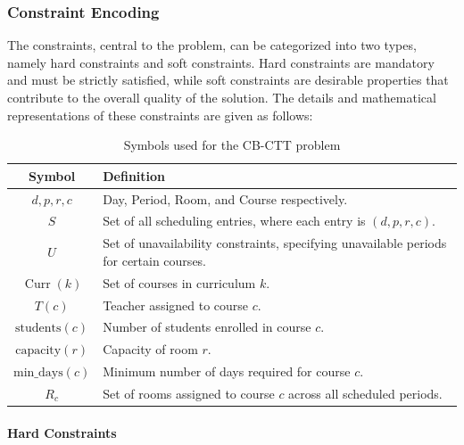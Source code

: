 \subsubsection*{Constraint Encoding}

The constraints, central to the problem, can be categorized into two types, namely hard constraints and soft constraints. Hard constraints are mandatory and must be strictly satisfied, while soft constraints are desirable properties that contribute to the overall quality of the solution. The details and mathematical representations of these constraints are given as follows:

\clearpage

\begin{table}[h]
    \centering
    \begin{tabular}{|c|p{10cm}|}
    \hline
    \textbf{Symbol} & \textbf{Definition} \\ \hline
    \(d, p, r, c\) & Day, Period, Room, and Course respectively. \\ \hline
    \(S\) & Set of all scheduling entries, where each entry is \((d, p, r, c)\). \\ \hline
    \(U\) & Set of unavailability constraints, specifying unavailable periods for certain courses. \\ \hline
    \(\operatorname{Curr}(k)\) & Set of courses in curriculum \(k\). \\ \hline
    \(T(c)\) & Teacher assigned to course \(c\). \\ \hline
    \(\text{students}(c)\) & Number of students enrolled in course \(c\). \\ \hline
    \(\text{capacity}(r)\) & Capacity of room \(r\). \\ \hline
    \(\text{min\_days}(c)\) & Minimum number of days required for course \(c\). \\ \hline
    \(R_c\) & Set of rooms assigned to course \(c\) across all scheduled periods. \\ \hline
    \end{tabular}
    \caption{Symbols used for the CB-CTT problem}
    \label{tab:symbols}
\end{table}

\paragraph*{Hard Constraints}

